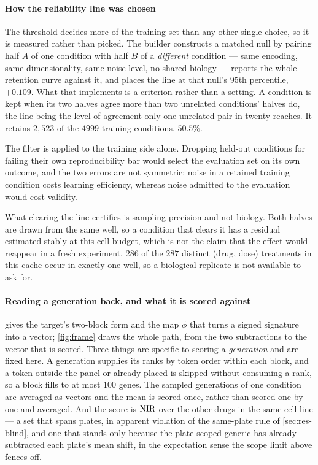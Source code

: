  \paragraph{How the reliability line was chosen} The threshold decides more of the
training set than any other single choice, so it is measured rather than picked.
The builder constructs a matched null by pairing half $A$ of one condition with
half $B$ of a \emph{different} condition --- same encoding, same dimensionality,
same noise level, no shared biology --- reports the whole retention curve against
it, and places the line at that null's $95$th percentile, $+0.109$. What that implements is a criterion
rather than a setting. A condition is kept when its two halves agree more than two
unrelated conditions' halves do, the line being the level of agreement only one
unrelated pair in twenty reaches. It retains $2{,}523$ of the $\num{4999}$
training conditions, $50.5\%$.

The filter is applied to the training side alone. Dropping held-out conditions for
failing their own reproducibility bar would select the evaluation set on its own
outcome, and the two errors are not symmetric: noise in a retained training
condition costs learning efficiency, whereas noise admitted to the evaluation
would cost validity.

What clearing the line certifies is sampling precision and not biology. Both
halves are drawn from the same well, so a condition that clears it has a residual
estimated stably at this cell budget, which is not the claim that the effect would
reappear in a fresh experiment. $\num{286}$ of the $\num{287}$ distinct (drug,
dose) treatments in this cache occur in exactly one well, so a biological
replicate is not available to ask for.

  \paragraph{Reading a generation back, and what it is scored against}
   gives the target's two-block form and the map $\phi$
  that turns a signed signature into a vector; \cref{fig:frame} draws the whole path,
  from the two subtractions to the vector that is scored. Three things are specific to
  scoring a \emph{generation} and are fixed here. A generation supplies its ranks by
  token order within each block, and a token outside the panel or already placed is
  skipped without consuming a rank, so a block fills to at most $100$ genes. The
  sampled generations of one condition are averaged as vectors and the mean is scored
  once, rather than scored one by one and averaged. And the score is $\textrm{NIR}$ over the
  other drugs in the same cell line --- a set that spans plates, in apparent violation
  of the same-plate rule of \cref{sec:res-blind}, and one that stands only because the
  plate-scoped generic has already subtracted each plate's mean shift, in the
  expectation sense the scope limit above fences off.
  
